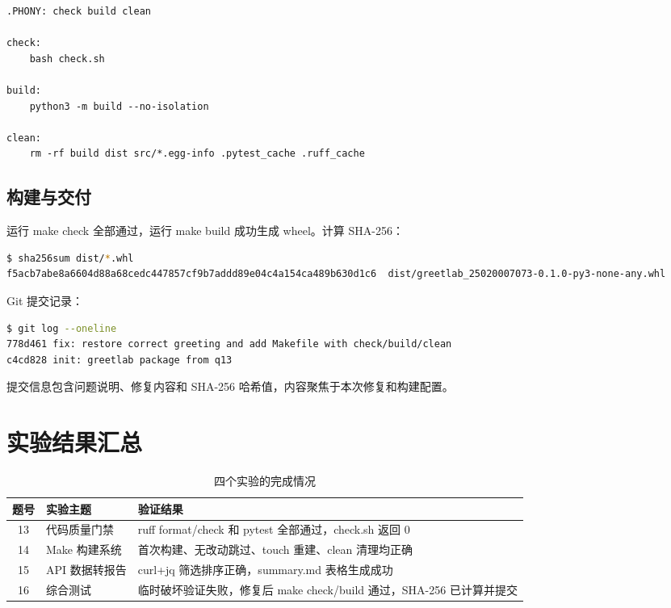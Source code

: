 \documentclass[UTF8]{ctexart}
\begin{document}
\begin{lstlisting}
.PHONY: check build clean

check:
	bash check.sh

build:
	python3 -m build --no-isolation

clean:
	rm -rf build dist src/*.egg-info .pytest_cache .ruff_cache
\end{lstlisting}

\subsection{构建与交付}

运行 make check 全部通过，运行 make build 成功生成 wheel。计算 SHA-256：

\begin{lstlisting}[language=bash]
$ sha256sum dist/*.whl
f5acb7abe8a6604d88a68cedc447857cf9b7addd89e04c4a154ca489b630d1c6  dist/greetlab_25020007073-0.1.0-py3-none-any.whl
\end{lstlisting}

Git 提交记录：

\begin{lstlisting}[language=bash]
$ git log --oneline
778d461 fix: restore correct greeting and add Makefile with check/build/clean
c4cd828 init: greetlab package from q13
\end{lstlisting}

提交信息包含问题说明、修复内容和 SHA-256 哈希值，内容聚焦于本次修复和构建配置。

\section{实验结果汇总}

\begin{table}[htbp]
\centering
\caption{四个实验的完成情况}
\label{tab:summary}
\begin{tabular}{cll}
\toprule
题号 & 实验主题 & 验证结果 \\
\midrule
13 & 代码质量门禁 & ruff format/check 和 pytest 全部通过，check.sh 返回 0 \\
14 & Make 构建系统 & 首次构建、无改动跳过、touch 重建、clean 清理均正确 \\
15 & API 数据转报告 & curl+jq 筛选排序正确，summary.md 表格生成成功 \\
16 & 综合测试 & 临时破坏验证失败，修复后 make check/build 通过，SHA-256 已计算并提交 \\
\bottomrule
\end{tabular}
\end{table}
\end{document}

